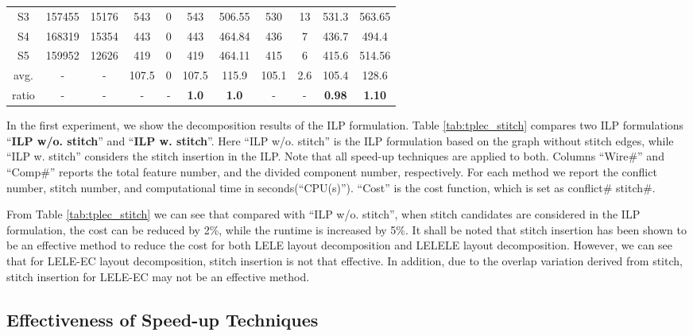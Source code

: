 \documentclass[12pt]{spieman}
\theoremstyle{plain}
\begin{document}
\begin{spacing}{1}
\begin{table*}[htb]
{\begin{tabular}{|c|c|c |c|c|c|c||c|c|c|c||}
 S3           &157455  &15176      &543   &0    &543     &506.55     &530     &13    &531.3   &563.65 \\    
 S4           &168319  &15354      &443   &0    &443     &464.84     &436     &7     &436.7   &494.4  \\   
 S5           &159952  &12626      &419   &0    &419     &464.11     &415     &6     &415.6   &514.56 \\    
 \hline
 avg.         &-       &-          &107.5 &0    &107.5   &115.9      &105.1   &2.6   &105.4   &128.6  \\  
 \hline
 ratio        &-       &-          &-	    &-    &\textbf{1.0}   &\textbf{1.0}
                                   &-     &-    &\textbf{0.98}  &\textbf{1.10}\\

 \hline \hline
\end{tabular}
}
\end{table*}


In the first experiment, we show the decomposition results of the ILP formulation.
Table \ref{tab:tplec_stitch} compares two ILP formulations ``\textbf{ILP w/o. stitch}'' and ``\textbf{ILP w. stitch}''.
Here ``ILP w/o. stitch'' is the ILP formulation based on the graph without stitch edges, while ``ILP w. stitch'' considers the stitch insertion in the ILP.
Note that all speed-up techniques are applied to both.
Columns ``Wire\#'' and ``Comp\#'' reports the total feature number, and the divided component number, respectively.
For each method we report the conflict number, stitch number, and computational time in seconds(``CPU(s)'').
``Cost'' is the cost function, which is set as conflict\#  stitch\#.

From Table \ref{tab:tplec_stitch} we can see that
compared with ``ILP w/o. stitch'', when stitch candidates are considered in the ILP formulation, the cost can be reduced by 2\%, while the runtime is increased by 5\%.
It shall be noted that stitch insertion has been shown to be an effective method to reduce the cost for both LELE layout decomposition and LELELE layout decomposition.
However, we can see that for LELE-EC layout decomposition, stitch insertion is not that effective.
In addition, due to the overlap variation derived from stitch, stitch insertion for LELE-EC may not be an effective method.

\subsection{Effectiveness of Speed-up Techniques}


\end{spacing}
\end{document}
